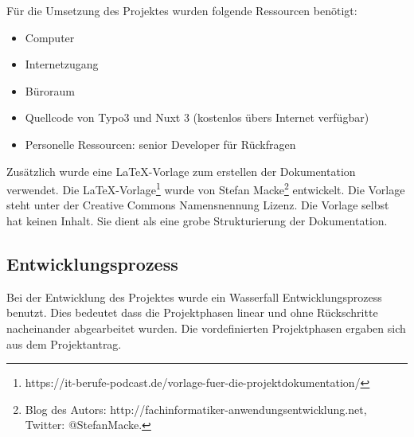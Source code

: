 Für die Umsetzung des Projektes wurden folgende Ressourcen benötigt:
\begin{itemize}
	\item Computer
	\item Internetzugang
	\item Büroraum
	\item Quellcode von Typo3 und Nuxt 3 (kostenlos übers Internet verfügbar)
	\item Personelle Ressourcen: senior Developer für Rückfragen
\end{itemize}

Zusätzlich wurde eine LaTeX-Vorlage zum erstellen der Dokumentation verwendet.  Die LaTeX-Vorlage\footnote{\Vgl https://it-berufe-podcast.de/vorlage-fuer-die-projektdokumentation/} wurde von Stefan Macke\footnote{\Vgl Blog des Autors: http://fachinformatiker-anwendungsentwicklung.net, Twitter: @StefanMacke.} entwickelt. Die Vorlage steht unter der Creative Commons Namensnennung Lizenz. Die Vorlage selbst hat keinen Inhalt. Sie dient als eine grobe Strukturierung der Dokumentation.

\subsection{Entwicklungsprozess}
\label{sec:Entwicklungsprozess}

Bei der Entwicklung des Projektes wurde ein Wasserfall Entwicklungsprozess benutzt. Dies bedeutet dass die Projektphasen linear und ohne Rückschritte nacheinander abgearbeitet wurden. Die vordefinierten Projektphasen ergaben sich aus dem Projektantrag.
